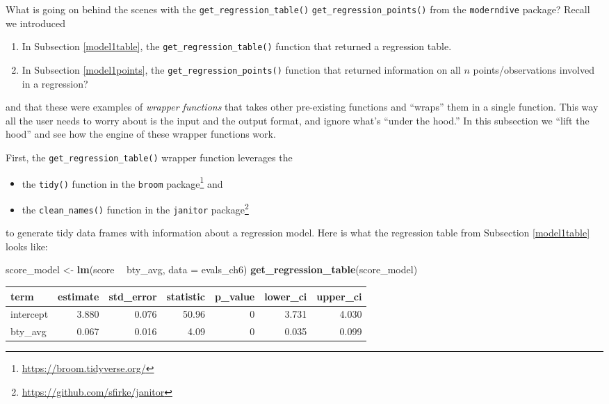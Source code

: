 \documentclass[12pt,]{krantz}
\makeatletter
\newenvironment{Shaded}{\begin{snugshade}}{\end{snugshade}}
\newcommand{\KeywordTok}[1]{\textcolor[rgb]{0.27,0.27,0.27}{\textbf{#1}}}
\newcommand{\DataTypeTok}[1]{\textcolor[rgb]{0.27,0.27,0.27}{#1}}
\newcommand{\StringTok}[1]{\textcolor[rgb]{0.5,0.5,0.5}{#1}}
\newcommand{\OperatorTok}[1]{\textcolor[rgb]{0.43,0.43,0.43}{\textbf{#1}}}
\newcommand{\NormalTok}[1]{#1}
\providecommand{\tightlist}{%
  \setlength{\itemsep}{0pt}\setlength{\parskip}{0pt}}
\renewcommand{\href}[2]{#2\footnote{\url{#1}}}
\newenvironment{kframe}{%
\medskip{}
\setlength{\fboxsep}{.8em}
 \def\at@end@of@kframe{}%
 \ifinner\ifhmode%
  \def\at@end@of@kframe{\end{minipage}}%
  \begin{minipage}{\columnwidth}%
 \fi\fi%
 \def\FrameCommand##1{\hskip\@totalleftmargin \hskip-\fboxsep
 \colorbox{shadecolor}{##1}\hskip-\fboxsep
     \hskip-\linewidth \hskip-\@totalleftmargin \hskip\columnwidth}%
 \MakeFramed {\advance\hsize-\width
   \@totalleftmargin\z@ \linewidth\hsize
   \@setminipage}}%
 {\par\unskip\endMakeFramed%
 \at@end@of@kframe}
\renewenvironment{Shaded}{\begin{kframe}}{\end{kframe}}
\theoremstyle{definition}
\theoremstyle{definition}
\theoremstyle{definition}
\theoremstyle{remark}
\makeatother
\begin{document}
What is going on behind the scenes with the
\texttt{get\_regression\_table()} \texttt{get\_regression\_points()}
from the \texttt{moderndive} package? Recall we introduced

\begin{enumerate}
\def\labelenumi{\arabic{enumi}.}
\tightlist
\item
  In Subsection \ref{model1table}, the \texttt{get\_regression\_table()}
  function that returned a regression table.
\item
  In Subsection \ref{model1points}, the
  \texttt{get\_regression\_points()} function that returned information
  on all \(n\) points/observations involved in a regression?
\end{enumerate}

and that these were examples of \emph{wrapper functions} that takes
other pre-existing functions and ``wraps'' them in a single function.
This way all the user needs to worry about is the input and the output
format, and ignore what's ``under the hood.'' In this subsection we
``lift the hood'' and see how the engine of these wrapper functions
work.

First, the \texttt{get\_regression\_table()} wrapper function leverages
the

\begin{itemize}
\tightlist
\item
  the \texttt{tidy()} function in the
  \href{https://broom.tidyverse.org/}{\texttt{broom} package} and
\item
  the \texttt{clean\_names()} function in the
  \href{https://github.com/sfirke/janitor}{\texttt{janitor} package}
\end{itemize}

to generate tidy data frames with information about a regression model.
Here is what the regression table from Subsection \ref{model1table}
looks like:

\begin{Shaded}
\begin{Highlighting}[]
\NormalTok{score_model <-}\StringTok{ }\KeywordTok{lm}\NormalTok{(score }\OperatorTok{~}\StringTok{ }\NormalTok{bty_avg, }\DataTypeTok{data =}\NormalTok{ evals_ch6)}
\KeywordTok{get_regression_table}\NormalTok{(score_model)}
\end{Highlighting}
\end{Shaded}

\begin{table}[H]
\centering\begingroup\fontsize{10}{12}\selectfont

\begin{tabular}{l|r|r|r|r|r|r}
\hline
term & estimate & std\_error & statistic & p\_value & lower\_ci & upper\_ci\\
\hline
intercept & 3.880 & 0.076 & 50.96 & 0 & 3.731 & 4.030\\
\hline
bty\_avg & 0.067 & 0.016 & 4.09 & 0 & 0.035 & 0.099\\
\hline
\end{tabular}
\endgroup{}
\end{table}
\end{document}
